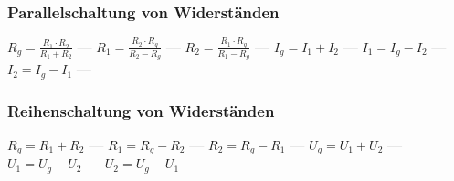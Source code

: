 \subsubsection{Parallelschaltung von Widerständen} 
\begin{minipage}{0.45\textwidth} 
\end{minipage} 
\begin{minipage}{0.45\textwidth} 
 
\end{minipage} 
$ R_{g}  = \frac{R_{1} \cdot R_{2} }{R_{1} +R_{2} } $ \textcolor{lightgray}{\textbf{---}} 
$ R_{1}  = \frac{R_{2} \cdot R_{g} }{R_{2} -R_{g} } $ \textcolor{lightgray}{\textbf{---}} 
$ R_{2}  = \frac{R_{1} \cdot R_{g} }{R_{1} -R_{g} } $ \textcolor{lightgray}{\textbf{---}} 
$ I_{g}  = I_{1}  + I_{2} $ \textcolor{lightgray}{\textbf{---}} 
$ I_{1}  = I_{g}  - I_{2} $ \textcolor{lightgray}{\textbf{---}} 
$ I_{2}  = I_{g}  - I_{1} $ \textcolor{lightgray}{\textbf{---}} 

\subsubsection{Reihenschaltung von Widerständen} 
\begin{minipage}{0.45\textwidth} 
\end{minipage} 
\begin{minipage}{0.45\textwidth} 
 
\end{minipage} 
$ R_{g}  = R_{1}  + R_{2} $ \textcolor{lightgray}{\textbf{---}} 
$ R_{1}  = R_{g}  - R_{2} $ \textcolor{lightgray}{\textbf{---}} 
$ R_{2}  = R_{g}  - R_{1} $ \textcolor{lightgray}{\textbf{---}} 
$ U_{g}  = U_{1}  + U_{2} $ \textcolor{lightgray}{\textbf{---}} 
$ U_{1}  = U_{g}  - U_{2} $ \textcolor{lightgray}{\textbf{---}} 
$ U_{2}  = U_{g}  - U_{1} $ \textcolor{lightgray}{\textbf{---}} 

